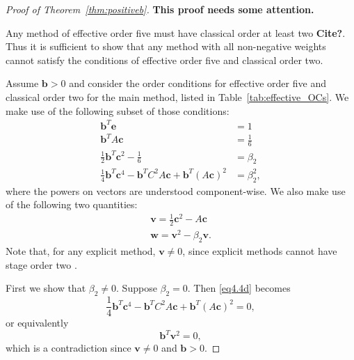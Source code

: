 \begin{proof}[Proof of Theorem~\ref{thm:positiveb}]
    {\bf This proof needs some attention.}

    Any method of effective order five must have classical order at least two {\bf Cite?}.
    Thus it is sufficient to show that any method with all non-negative weights
    cannot satisfy the conditions of effective order five and classical order two.

    Assume $\bm{b}>0$ and consider the order conditions for effective order five and classical order two for the main method, listed in Table~\ref{tab:effective_OCs}.  We make use of the following subset of those conditions:
    \begin{subequations}\label{eq4.4}
        \begin{align}
            \bm{b}^{T}\bm{e} &= 1 \label{eq4.4a} \\
            \bm{b}^{T}A\bm{c} &= \frac{1}{6} \label{eq4.4b} \\
            \frac{1}{2}\bm{b}^{T}\bm{c}^{2} - \frac{1}{6} &= \beta_{2} \label{eq4.4c} \\
            \frac{1}{4}\bm{b}^{T}\bm{c}^{4} - \bm{b}^{T}C^{2}A\bm{c} + \bm{b}^{T}(A\bm{c})^{2} &= \beta_{2}^{2}, \label{eq4.4d}
        \end{align}
    \end{subequations}
    where the powers on vectors are understood component-wise. 
    We also make use of the following two quantities:
    \begin{align*} 
        \bm{v} = \frac{1}{2}\bm{c}^{2} - A\bm{c} \\
        \bm{w} = \bm{v}^{2} - \beta_{2}\bm{v}.
    \end{align*}
    Note that, for any explicit method, $\bm{v}\ne 0$, since explicit methods
    cannot have stage order two \cite{Kraaijevanger1991}.

    First we show that $\beta_2 \ne 0$.  Suppose $\beta_2=0$.
    Then \eqref{eq4.4d} becomes
    \begin{equation*}
        \frac{1}{4}\bm{b}^{T}\bm{c}^{4} - \bm{b}^{T}C^{2}A\bm{c} + \bm{b}^{T}(A\bm{c})^{2} = 0,
    \end{equation*}
    or equivalently
    \begin{equation*}
        \bm{b}^{T}\bm{v}^{2} = 0,
    \end{equation*}
    which is a contradiction since $\bm{v}\ne0$ and $\bm{b}>0$.


\end{proof}
